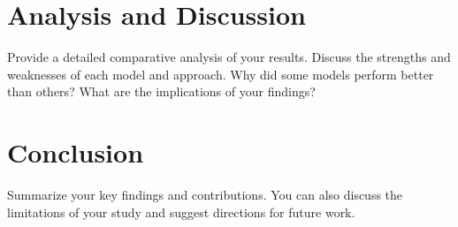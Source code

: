 \documentclass{ecai}
\begin{document}
\section{Analysis and Discussion}
\label{sec:analysis}
Provide a detailed comparative analysis of your results. Discuss the strengths and weaknesses of each model and approach. Why did some models perform better than others? What are the implications of your findings?

\section{Conclusion}
\label{sec:conclusion}
Summarize your key findings and contributions. You can also discuss the limitations of your study and suggest directions for future work.


\end{document}

